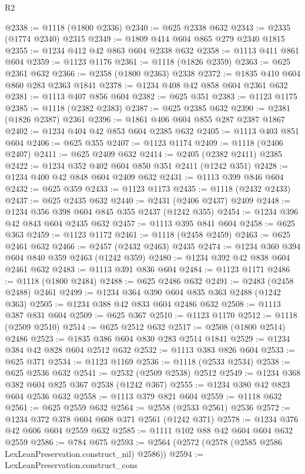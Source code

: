 \begin{lexlean}{R2}
\begin{coremodule}
@2338 := @1118 (@1800 @2336)
@2340 := @625 @2338 @632
@2343 := @2335 (@1774 @2340) @2315
@2349 := @1809 @414 @604 @865 @279 @2340 @1815
@2355 := @1234 @412 @42 @863 @604 @2338 @632
@2358 := @1113 @411 @861 @604
@2359 := @1123 @1176
@2361 := @1118 (@1826 @2359)
@2363 := @625 @2361 @632
@2366 := @2358 (@1800 @2363) @2338
@2372 := @1835 @410 @604 @860 @283 @2363 @1841
@2378 := @1234 @408 @42 @858 @604 @2361 @632
@2381 := @1113 @407 @856 @604
@2382 := @625 @351
@2383 := @1123 @1175
@2385 := @1118 (@2382 @2383)
@2387 := @625 @2385 @632
@2390 := @2381 (@1826 @2387) @2361
@2396 := @1861 @406 @604 @855 @287 @2387 @1867
@2402 := @1234 @404 @42 @853 @604 @2385 @632
@2405 := @1113 @403 @851 @604
@2406 := @625 @355
@2407 := @1123 @1174
@2409 := @1118 (@2406 @2407)
@2411 := @625 @2409 @632
@2414 := @2405 (@2382 @2411) @2385
@2422 := @1234 @352 @402 @604 @850 @351 @2411 (@1242 @351)
@2428 := @1234 @400 @42 @848 @604 @2409 @632
@2431 := @1113 @399 @846 @604
@2432 := @625 @359
@2433 := @1123 @1173
@2435 := @1118 (@2432 @2433)
@2437 := @625 @2435 @632
@2440 := @2431 (@2406 @2437) @2409
@2448 := @1234 @356 @398 @604 @845 @355 @2437 (@1242 @355)
@2454 := @1234 @396 @42 @843 @604 @2435 @632
@2457 := @1113 @395 @841 @604
@2458 := @625 @363
@2459 := @1123 @1172
@2461 := @1118 (@2458 @2459)
@2463 := @625 @2461 @632
@2466 := @2457 (@2432 @2463) @2435
@2474 := @1234 @360 @394 @604 @840 @359 @2463 (@1242 @359)
@2480 := @1234 @392 @42 @838 @604 @2461 @632
@2483 := @1113 @391 @836 @604
@2484 := @1123 @1171
@2486 := @1118 (@1800 @2484)
@2488 := @625 @2486 @632
@2491 := @2483 (@2458 @2488) @2461
@2499 := @1234 @364 @390 @604 @835 @363 @2488 (@1242 @363)
@2505 := @1234 @388 @42 @833 @604 @2486 @632
@2508 := @1113 @387 @831 @604
@2509 := @625 @367
@2510 := @1123 @1170
@2512 := @1118 (@2509 @2510)
@2514 := @625 @2512 @632
@2517 := @2508 (@1800 @2514) @2486
@2523 := @1835 @386 @604 @830 @283 @2514 @1841
@2529 := @1234 @384 @42 @828 @604 @2512 @632
@2532 := @1113 @383 @826 @604
@2533 := @625 @371
@2534 := @1123 @1169
@2536 := @1118 (@2533 @2534)
@2538 := @625 @2536 @632
@2541 := @2532 (@2509 @2538) @2512
@2549 := @1234 @368 @382 @604 @825 @367 @2538 (@1242 @367)
@2555 := @1234 @380 @42 @823 @604 @2536 @632
@2558 := @1113 @379 @821 @604
@2559 := @1118 @632
@2561 := @625 @2559 @632
@2564 := @2558 (@2533 @2561) @2536
@2572 := @1234 @372 @378 @604 @608 @371 @2561 (@1242 @371)
@2578 := @1234 @376 @42 @606 @604 @2559 @632
@2585 := @1111 @102 @88 @42 @604 @604 @632 @2559
@2586 := @784 @675
@2593 := @2564 (@2572 (@2578 (@2585 @2586 LexLeanPreservation.construct_nil) @2586))
@2594 := LexLeanPreservation.construct_cons

\end{coremodule}
\end{lexlean}
